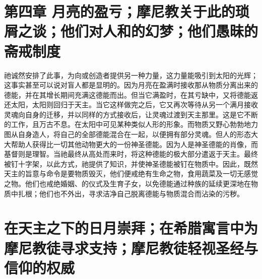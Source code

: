 
\section{第四章 月亮的盈亏；摩尼教关于此的琐屑之谈；他们对人和的幻梦；他们愚昧的斋戒制度}

祂诚然安排了此事，为向或创造者提供另一种力量，这力量能吸引到太阳的光辉；这事实甚至可以说对盲人都是显明的。因为月亮在盈满时接收那从物质分离出来的德能，并在其增长期间充满这德能而出。但当它满盈时，在其亏缺中，又将德能返还太阳，太阳则回归于天主。当它这样做完之后，它又再次等待从另一个满月接收灵魂向自身的迁移，并以同样的方式接收后，让灵魂过渡到天主那里。这是它不断的工作，且万古不息。在太阳中可见某种类似人形的形象。而物质又野心勃勃地力图从自身造人，将自己的全部德能混合在一起，以便拥有部分灵魂。但人的形态大大帮助人获得比一切其他动物更大的一份神圣德能。因为人是神圣德能的肖像，而基督则是理智。当祂最终从高处而来时，将这种德能的极大部分遣返于天主。最终被钉十字架，以此方式，祂提供了知识，并使神圣德能被钉在物质中。因此，既然天主的旨意与命令是要物质毁灭，他们便戒绝有生命之物，食用蔬菜及一切无感觉之物。他们也戒绝婚姻、的仪式及生育子女，以免德能通过种族的延续更深地在物质中扎根；他们也不外出，寻求洁净自己脱离德能与物质混合而沾染的污秽。\par


\section{在天主之下的日月崇拜；在希腊寓言中为摩尼教徒寻求支持；摩尼教徒轻视圣经与信仰的权威}

